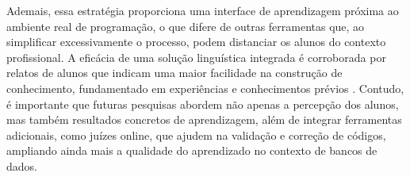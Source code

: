 Ademais, essa estratégia proporciona uma interface de aprendizagem próxima ao ambiente real de programação, o que difere de outras ferramentas que, ao simplificar excessivamente o processo, podem distanciar os alunos do contexto profissional. A eficácia de uma solução linguística integrada é corroborada por relatos de alunos que indicam uma maior facilidade na construção de conhecimento, fundamentado em experiências e conhecimentos prévios \cite{Silva2020}. Contudo, é importante que futuras pesquisas abordem não apenas a percepção dos alunos, mas também resultados concretos de aprendizagem, além de integrar ferramentas adicionais, como juízes online, que ajudem na validação e correção de códigos, ampliando ainda mais a qualidade do aprendizado no contexto de bancos de dados.

